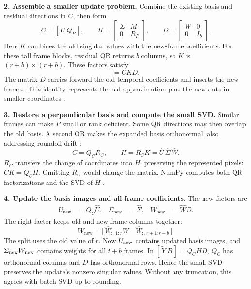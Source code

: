 \documentclass[11pt,a4paper]{article}
\begin{document}
\textbf{2. Assemble a smaller update problem.}
Combine the existing basis and residual directions in \(C\), then form
\begin{equation}
C=[\,U\ Q_P\,],\qquad
K=\begin{bmatrix}\Sigma&M\\0&R_P\end{bmatrix},\qquad
D=\begin{bmatrix}W&0\\0&I_b\end{bmatrix}.
\label{eq:core}
\end{equation}
Here \(K\) combines the old singular values with the new-frame coefficients.
For these tall frame blocks, residual QR returns \(b\) columns, so \(K\) is
\((r+b)\times(r+b)\). These factors satisfy
\begin{equation}
[\,\widetilde Y\ B\,]=CKD.
\label{eq:identity}
\end{equation}
The matrix \(D\) carries forward the old temporal coefficients and inserts
the new frames. This identity represents the old approximation plus the new
data in smaller coordinates \cite{kuhl,brand}.

\textbf{3. Restore a perpendicular basis and compute the small SVD.}
Similar frames can make \(P\) small or rank deficient. Some QR directions
may then overlap the old basis. A second QR makes the expanded basis
orthonormal, also addressing roundoff drift \cite{zhang}:
\[
C=Q_C R_C,\qquad
H=R_CK=\widehat U\,\widehat\Sigma\,\widehat W.
\]
\(R_C\) transfers the change of coordinates into \(H\), preserving the
represented pixels: \(CK=Q_CH\). Omitting \(R_C\) would change the matrix.
NumPy computes both QR factorizations and the SVD of \(H\) \cite{numpy}.

\textbf{4. Update the basis images and all frame coefficients.}
The new factors are
\begin{align}
U_{\mathrm{new}}&=Q_C\widehat U,&
\Sigma_{\mathrm{new}}&=\widehat\Sigma,&
W_{\mathrm{new}}&=\widehat W D.
\label{eq:update}
\end{align}
The right factor keeps old and new frame columns together:
\[
W_{\mathrm{new}}
=\bigl[\,\widehat W_{:,1:r}W\quad
        \widehat W_{:,r+1:r+b}\,\bigr].
\]
The split uses the old value of \(r\). Now \(U_{\rm new}\) contains updated
basis images, and \(\Sigma_{\rm new}W_{\rm new}\) contains weights for all
\(t+b\) frames. In \([\,\widetilde Y\ B\,]=Q_CHD\), \(Q_C\) has orthonormal
columns and \(D\) has orthonormal rows. Hence the small SVD preserves the
update's nonzero singular values. Without any truncation, this agrees with
batch SVD up to rounding.
\end{document}
